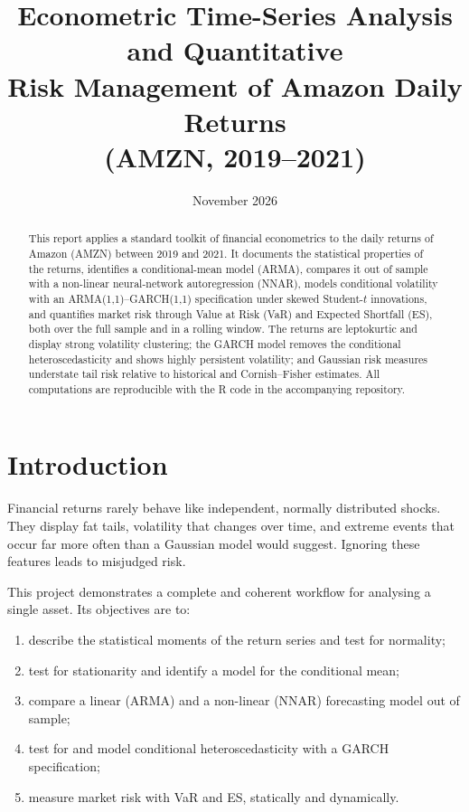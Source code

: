 \documentclass[11pt,a4paper]{article}
\title{\textbf{Econometric Time-Series Analysis and Quantitative\\Risk Management of Amazon Daily Returns\\(AMZN, 2019--2021)}}
\author{\authorname}
\date{November 2026}
\begin{document}
\maketitle

\begin{abstract}
\noindent This report applies a standard toolkit of financial econometrics to the daily returns of Amazon (AMZN) between 2019 and 2021. It documents the statistical properties of the returns, identifies a conditional-mean model (ARMA), compares it out of sample with a non-linear neural-network autoregression (NNAR), models conditional volatility with an ARMA(1,1)--GARCH(1,1) specification under skewed Student-$t$ innovations, and quantifies market risk through Value at Risk (VaR) and Expected Shortfall (ES), both over the full sample and in a rolling window. The returns are leptokurtic and display strong volatility clustering; the GARCH model removes the conditional heteroscedasticity and shows highly persistent volatility; and Gaussian risk measures understate tail risk relative to historical and Cornish--Fisher estimates. All computations are reproducible with the \textsf{R} code in the accompanying repository.
\end{abstract}

\tableofcontents
\newpage

\section{Introduction}
Financial returns rarely behave like independent, normally distributed shocks. They display fat tails, volatility that changes over time, and extreme events that occur far more often than a Gaussian model would suggest. Ignoring these features leads to misjudged risk.

This project demonstrates a complete and coherent workflow for analysing a single asset. Its objectives are to:
\begin{enumerate}
  \item describe the statistical moments of the return series and test for normality;
  \item test for stationarity and identify a model for the conditional mean;
  \item compare a linear (ARMA) and a non-linear (NNAR) forecasting model out of sample;
  \item test for and model conditional heteroscedasticity with a GARCH specification;
  \item measure market risk with VaR and ES, statically and dynamically.
\end{enumerate}
\end{document}
